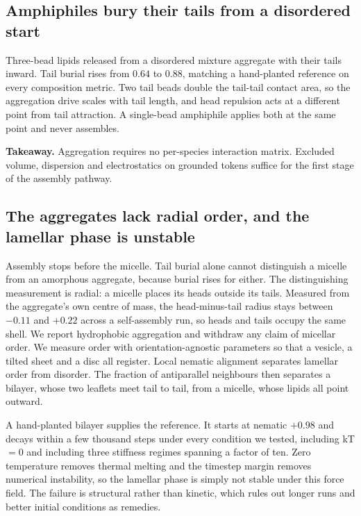 \documentclass[10pt,twocolumn]{article}
\begin{document}
\subsection{Amphiphiles bury their tails from a disordered start}

Three-bead lipids released from a disordered mixture aggregate with their tails inward. Tail burial
rises from $0.64$ to $0.88$, matching a hand-planted reference on every composition metric. Two tail
beads double the tail-tail contact area, so the aggregation drive scales with tail length, and head
repulsion acts at a different point from tail attraction. A single-bead amphiphile applies both at
the same point and never assembles.

\textbf{Takeaway.} Aggregation requires no per-species interaction matrix. Excluded volume,
dispersion and electrostatics on grounded tokens suffice for the first stage of the assembly pathway.

\subsection{The aggregates lack radial order, and the lamellar phase is unstable}

Assembly stops before the micelle. Tail burial alone cannot distinguish a micelle from an amorphous
aggregate, because burial rises for either. The distinguishing measurement is radial: a micelle places
its heads outside its tails. Measured from the aggregate's own centre of mass, the head-minus-tail
radius stays between $-0.11$ and $+0.22$ across a self-assembly run, so heads and tails occupy the
same shell. We report hydrophobic aggregation and withdraw any claim of micellar order. We measure order with orientation-agnostic parameters so that a
vesicle, a tilted sheet and a disc all register. Local nematic alignment separates lamellar order
from disorder. The fraction of antiparallel neighbours then separates a bilayer, whose two leaflets
meet tail to tail, from a micelle, whose lipids all point outward.

A hand-planted bilayer supplies the reference. It starts at nematic $+0.98$ and decays within a few
thousand steps under every condition we tested, including kT$=0$ and including three stiffness
regimes spanning a factor of ten. Zero temperature removes thermal melting and the timestep margin
removes numerical instability, so the lamellar phase is simply not stable under this force field.
The failure is structural rather than kinetic, which rules out longer runs and better initial
conditions as remedies.
\end{document}
